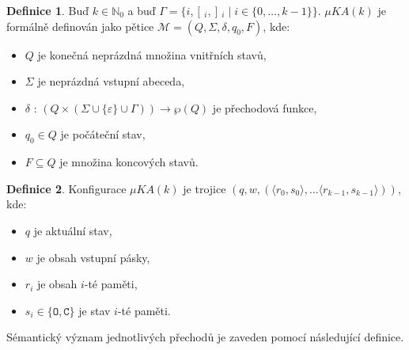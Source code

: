 \documentclass[thesis=B,czech]{FITthesis}[2019/12/23]
\theoremstyle{definition}
\newtheorem{definition}{Definice}[chapter]
\begin{document}
\begin{definition}
Buď $k \in \mathbb{N}_0$ a buď $\Gamma = \{i, [\,_i, ]\,_i \mid i \in \{0,\dots, k-1\}\}$.
$\mu KA(k)$ je formálně definován jako pětice $\mathcal{M} = \left(Q, \Sigma, \delta, q_0, F\right)$, kde:
\begin{itemize}
	\item{$Q$ je konečná neprázdná množina vnitřních stavů,}
	\item{$\Sigma$ je neprázdná vstupní abeceda,}
	\item{$\delta$ : $\left(Q \times (\Sigma \cup \{\varepsilon\} \cup \Gamma)\right) \rightarrow \wp\left( Q \right)$ je přechodová funkce,}
	\item{$q_0 \in Q$ je počáteční stav,}
	\item{$F \subseteq Q$ je množina koncových stavů.}
\end{itemize}
\end{definition}

\begin{definition}
Konfigurace $\mu KA(k)$ je trojice ${(q, w, (\big\langle r_0, s_0\big\rangle, \dots \big\langle r_{k-1}, s_{k-1}\big\rangle))}$, kde:
\begin{itemize}
	\item $q$ je aktuální stav,
	\item $w$ je obsah vstupní pásky,
	\item $r_i$ je obsah $i$-té paměti,
	\item $s_i \in \{\texttt{O}, \texttt{C}\}$ je stav $i$-té paměti. 
\end{itemize}
\end{definition}

Sémantický význam jednotlivých přechodů je zaveden pomocí následující definice.
\end{document}
